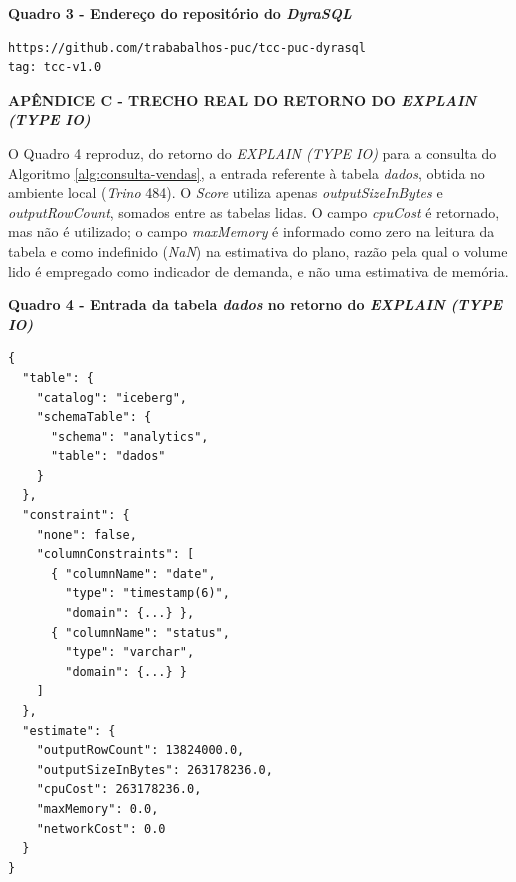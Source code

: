 \begin{center}
\textbf{Quadro 3 - Endereço do repositório do \textit{DyraSQL}}
\end{center}

\begin{framed}
\begin{verbatim}
https://github.com/trababalhos-puc/tcc-puc-dyrasql
tag: tcc-v1.0
\end{verbatim}
\end{framed}


\newpage

\begin{center}
\textbf{APÊNDICE C - TRECHO REAL DO RETORNO DO \textit{EXPLAIN (TYPE IO)}}
\end{center}

\vspace{0.5cm}

O Quadro 4 reproduz, do retorno do \textit{EXPLAIN (TYPE IO)} para a consulta do Algoritmo \ref{alg:consulta-vendas}, a entrada referente à tabela \textit{dados}, obtida no ambiente local (\textit{Trino} 484). O \textit{Score} utiliza apenas \textit{outputSizeInBytes} e \textit{outputRowCount}, somados entre as tabelas lidas. O campo \textit{cpuCost} é retornado, mas não é utilizado; o campo \textit{maxMemory} é informado como zero na leitura da tabela e como indefinido (\textit{NaN}) na estimativa do plano, razão pela qual o volume lido é empregado como indicador de demanda, e não uma estimativa de memória.

\begin{center}
\textbf{Quadro 4 - Entrada da tabela \textit{dados} no retorno do \textit{EXPLAIN (TYPE IO)}}
\end{center}

\begin{framed}
\begin{verbatim}
{
  "table": {
    "catalog": "iceberg",
    "schemaTable": {
      "schema": "analytics",
      "table": "dados"
    }
  },
  "constraint": {
    "none": false,
    "columnConstraints": [
      { "columnName": "date",
        "type": "timestamp(6)",
        "domain": {...} },
      { "columnName": "status",
        "type": "varchar",
        "domain": {...} }
    ]
  },
  "estimate": {
    "outputRowCount": 13824000.0,
    "outputSizeInBytes": 263178236.0,
    "cpuCost": 263178236.0,
    "maxMemory": 0.0,
    "networkCost": 0.0
  }
}
\end{verbatim}
\end{framed}

